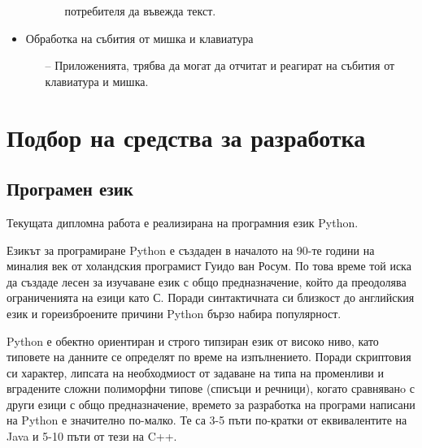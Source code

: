 \begin{itemize}
\begin{itemize}
\begin{itemize}
                                                        потребителя да въвежда
                                                        текст.
                                        \end{itemize}
                        \end{itemize}
                \item Обработка на събития от мишка и клавиатура
                        \begin{itemize}
                                \item[--] Приложенията, трябва да могат да
                                        отчитат и реагират на събития от 
                                        клавиатура и мишка.
                        \end{itemize}
        \end{itemize}

\section{Подбор на средства за разработка}
        \subsection{Програмен език}

                Текущата дипломна работа е реализирана на програмния език 
                Python.
                \newline

                Езикът за програмиране Python е създаден в началото на 90-те 
                години на миналия век от холандския програмист Гуидо ван Росум.
                По това време той иска да създаде лесен за изучаване език с 
                общо предназначение, който да преодолява ограниченията на езици
                като С. Поради синтактичната си близкост до английския език и 
                гореизброените причини Python бързо набира популярност. 

                Python е обектно ориентиран и строго типзиран език от високо
                ниво, като типовете на данните се определят по време на 
                изпълнението. Поради скриптовия си характер, липсата на 
                необходмиост от задаване на типа на променливи и вградените 
                сложни полиморфни типове (списъци и речници), когато сравняванo
                с други езици с общо предназначение, времето за разработка на 
                програми написани на Python е значително по-малко. Те са 3-5 
                пъти по-кратки от еквивалентите на Java и 5-10 пъти от тези на 
                C++.

